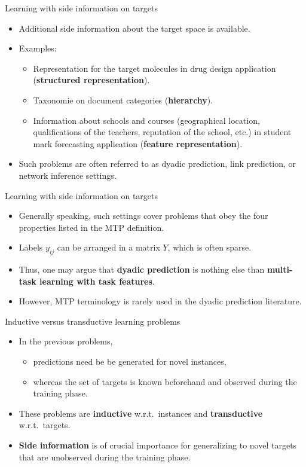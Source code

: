 \documentclass[]{beamer}
\renewcommand{\emph}[1]{\textbf{\color{putblue}#1}}
\begin{document}
\begin{frame}{Learning with side information on targets}
\begin{itemize}
\item Additional side information about the target space is available.
\item Examples: 
\begin{itemize}
\item Representation for the target molecules in drug design application (\emph{structured representation}).
\item Taxonomie on document categories (\emph{hierarchy}).
\item Information about schools and courses (geographical location, qualifications of the teachers, reputation of the school, etc.) in student mark forecasting application (\emph{feature representation}).
\end{itemize}
\item Such problems are often referred to as dyadic prediction, link prediction, or network inference settings.
\end{itemize}
\end{frame}


\begin{frame}{Learning with side information on targets}
\begin{itemize}
\item
Generally speaking, such settings cover problems that obey the four properties listed in the MTP definition. 
\item Labels $y_{ij}$ can be arranged in a matrix $Y$, which is often sparse. 
\item Thus, one may argue that \emph{dyadic prediction} is nothing else than \emph{multi-task learning with task features}. 
\item However, MTP terminology is rarely used in the dyadic prediction literature. 
\end{itemize}
\end{frame}


\begin{frame}{Inductive versus transductive learning problems}
\begin{itemize} 
\item In the previous problems, 
\begin{itemize}
\item predictions need be be generated for novel instances, 
\item whereas the set of targets is known beforehand and observed during the training phase.
\end{itemize}
\item These problems are \emph{inductive} w.r.t.\ instances and \emph{transductive} w.r.t.\ targets.
\item   
\emph{Side information} is of crucial importance for generalizing to novel targets that are unobserved during the training phase.
\end{itemize}
\end{frame}
\end{document}
